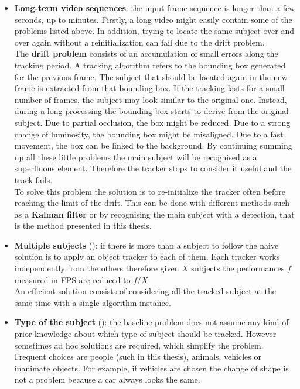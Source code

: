 \begin{itemize}
	\item \textbf{Long-term video sequences}: the input frame sequence is longer than a few seconds, up to minutes. Firstly, a long video might easily contain some of the problems listed above. In addition, trying to locate the same subject over and over again without a reinitialization can fail due to the drift problem.\\
	The \textbf{drift problem} consists of an accumulation of small errors along the tracking period. A tracking algorithm refers to the bounding box generated for the previous frame. The subject that should be located again in the new frame is extracted from that bounding box. If the tracking lasts for a small number of frames, the subject may look similar to the original one. Instead, during a long processing the bounding box starts to derive from the original subject. Due to partial occlusion, the box might be reduced. Due to a strong change of luminosity, the bounding box might be misaligned. Due to a fast movement, the box can be linked to the background. By continuing summing up all these little problems the main subject will be recognised as a superfluous element. Therefore the tracker stops to consider it useful and the track fails.\\
	To solve this problem the solution is to re-initialize the tracker often before reaching the limit of the drift. This can be done with different methods such as a \textbf{Kalman filter} or by recognising the main subject with a detection, that is the method presented in this thesis.
	
	\item \textbf{Multiple subjects} (): if there is more than a subject to follow the naive solution is to apply an object tracker to each of them. Each tracker works independently from the others therefore given $X$ subjects the performances $f$ measured in FPS are reduced to $f/X$.\\
	An efficient solution consists of considering all the tracked subject at the same time with a single algorithm instance.
	
	\item \textbf{Type of the subject} (): the baseline problem does not assume any kind of prior knowledge about which type of subject should be tracked. However sometimes ad hoc solutions are required, which simplify the problem. Frequent choices are people (such in this thesis), animals, vehicles or inanimate objects. For example, if vehicles are chosen the change of shape is not a problem because a car always looks the same.
	
\end{itemize}

